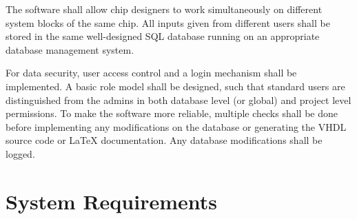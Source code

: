 The software shall allow chip designers to work simultaneously on different system blocks of the same chip. All inputs given from different users shall be stored in the same well-designed SQL database running on an appropriate database management system.

For data security, user access control and a login mechanism shall be implemented. A basic role model shall be designed, such that standard users are distinguished from the admins in both database level (or global) and project level permissions. To make the software more reliable, multiple checks shall be done before implementing any modifications on the database or generating the VHDL source code or LaTeX documentation. Any database modifications shall be logged.

\section{System Requirements}
